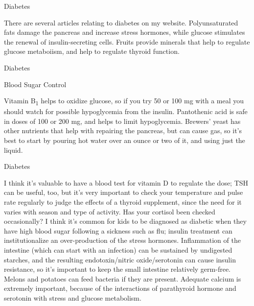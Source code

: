 \documentclass[11pt,oneside,openany,extrafontsizes]{memoir}
\begin{document}
\begin{standalonequote}{Diabetes}

    \begin{answer}
        There are several articles relating to diabetes on my website. Polyunsaturated fats damage the pancreas and increase stress hormones, while glucose stimulates the renewal of insulin-secreting cells. Fruits provide minerals that help to regulate glucose metaboiism, and help to regulate thyroid function.
    \end{answer}
\end{standalonequote}

\begin{standalonequote}{Diabetes}
    \begin{note}
        Blood Sugar Control
    \end{note}

    \begin{answer}
        Vitamin B\textsubscript{1} helps to oxidize glucose, so if you try 50 or 100 mg with a meal you should watch for possible hypoglycemia from the insulin. Pantothenic acid is safe in doses of 100 or 200 mg, and helps to limit hypoglycemia. Brewers' yeast has other nutrients that help with repairing the pancreas, but can cause gas, so it's best to start by pouring hot water over an ounce or two of it, and using just the liquid.
    \end{answer}
\end{standalonequote}

\begin{standalonequote}{Diabetes}

    \begin{answer}
        I think it's valuable to have a blood test for vitamin D to regulate the dose; TSH can be useful, too, but it's very important to check your temperature and pulse rate regularly to judge the effects of a thyroid supplement, since the need for it varies with season and type of activity. Has your cortisol been checked occasionally? I think it's common for kids to be diagnosed as diabetic when they have high blood sugar following a sickness such as flu; insulin treatment can institutionalize an over-production of the stress hormones. Inflammation of the intestine (which can start with an infection) can be sustained by undigested starches, and the resulting endotoxin/nitric oxide/serotonin can cause insulin resistance, so it's important to keep the small intestine relatively germ-free. Melons and potatoes can feed bacteria if they are present. Adequate calcium is extremely important, because of the interactions of parathyroid hormone and serotonin with stress and glucose metabolism.
    \end{answer}
\end{standalonequote}
\end{document}
